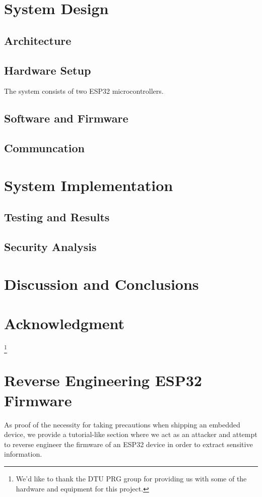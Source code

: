 \documentclass[conference]{IEEEtran}
\begin{document}
\section{System Design}
\label{sec:system_design}

\subsection{Architecture}
\subsection{Hardware Setup}
The system consists of two ESP32\cite{ESP32_Manual} microcontrollers.
\subsection{Software and Firmware}
\subsection{Communcation}

\section{System Implementation}
\label{sec:system_implementation}
\subsection{Testing and Results}
\label{subsec:testing_and_results}
\subsection{Security Analysis}
\label{subsec:security_analysis}

\section{Discussion and Conclusions}
\label{sec:discussion_and_conclusions}

\section*{Acknowledgment}

\thanks{We'd like to thank the DTU PRG group for providing us with some of the hardware and equipment for this project.}




\appendices

\section{Reverse Engineering ESP32 Firmware}

As proof of the necessity for taking precautions when shipping an embedded device, 
we provide a tutorial-like section where we act as an attacker and attempt to reverse engineer the firmware of an ESP32
device in order to extract sensitive information.
\end{document}
